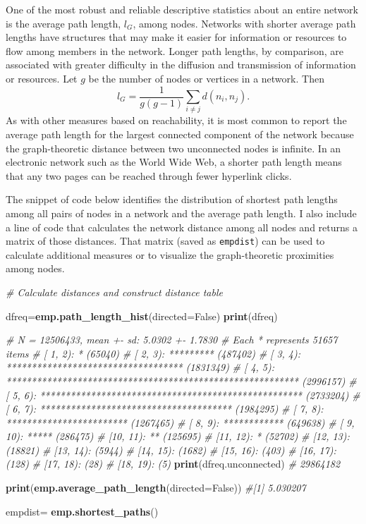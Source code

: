 \documentclass[]{krantz}
\newenvironment{Shaded}{\begin{snugshade}}{\end{snugshade}}
\newcommand{\KeywordTok}[1]{\textcolor[rgb]{0.13,0.29,0.53}{\textbf{#1}}}
\newcommand{\DataTypeTok}[1]{\textcolor[rgb]{0.13,0.29,0.53}{#1}}
\newcommand{\StringTok}[1]{\textcolor[rgb]{0.31,0.60,0.02}{#1}}
\newcommand{\CommentTok}[1]{\textcolor[rgb]{0.56,0.35,0.01}{\textit{#1}}}
\newcommand{\NormalTok}[1]{#1}
\begin{document}
One of the most robust and reliable descriptive statistics about an
entire network is the average path length, \(l_{G}\), among nodes.
Networks with shorter average path lengths have structures that may make
it easier for information or resources to flow among members in the
network. Longer path lengths, by comparison, are associated with greater
difficulty in the diffusion and transmission of information or
resources. Let \(g\) be the number of nodes or vertices in a network.
Then \[l_G=\frac{1}{g(g-1)}\sum_{i\neq j}d(n_i,n_j).\] As with other
measures based on reachability, it is most common to report the average
path length for the largest connected component of the network because
the graph-theoretic distance between two unconnected nodes is infinite.
In an electronic network such as the World Wide Web, a shorter path
length means that any two pages can be reached through fewer hyperlink
clicks.

The snippet of code below identifies the distribution of shortest path
lengths among all pairs of nodes in a network and the average path
length. I also include a line of code that calculates the network
distance among all nodes and returns a matrix of those distances. That
matrix (saved as \texttt{empdist}) can be used to calculate additional
measures or to visualize the graph-theoretic proximities among nodes.

\begin{Shaded}
\begin{Highlighting}[]
\CommentTok{# Calculate distances and construct distance table}

\NormalTok{dfreq=}\KeywordTok{emp.path_length_hist}\NormalTok{(}\DataTypeTok{directed=}\NormalTok{False)}
\KeywordTok{print}\NormalTok{(dfreq)}

\CommentTok{# N = 12506433, mean +- sd: 5.0302 +- 1.7830}
\CommentTok{# Each * represents 51657 items}
\CommentTok{# [ 1,  2): * (65040)}
\CommentTok{# [ 2,  3): ********* (487402)}
\CommentTok{# [ 3,  4): *********************************** (1831349)}
\CommentTok{# [ 4,  5): ********************************************************** (2996157)}
\CommentTok{# [ 5,  6): **************************************************** (2733204)}
\CommentTok{# [ 6,  7): ************************************** (1984295)}
\CommentTok{# [ 7,  8): ************************ (1267465)}
\CommentTok{# [ 8,  9): ************ (649638)}
\CommentTok{# [ 9, 10): ***** (286475)}
\CommentTok{# [10, 11): ** (125695)}
\CommentTok{# [11, 12): * (52702)}
\CommentTok{# [12, 13):  (18821)}
\CommentTok{# [13, 14):  (5944)}
\CommentTok{# [14, 15):  (1682)}
\CommentTok{# [15, 16):  (403)}
\CommentTok{# [16, 17):  (128)}
\CommentTok{# [17, 18):  (28)}
\CommentTok{# [18, 19):  (5)}
\KeywordTok{print}\NormalTok{(dfreq.unconnected)}
\CommentTok{# 29864182}

\KeywordTok{print}\NormalTok{(}\KeywordTok{emp.average_path_length}\NormalTok{(}\DataTypeTok{directed=}\NormalTok{False))}
\CommentTok{#[1] 5.030207}

\NormalTok{empdist=}\StringTok{ }\KeywordTok{emp.shortest_paths}\NormalTok{()}
\end{Highlighting}
\end{Shaded}
\end{document}
